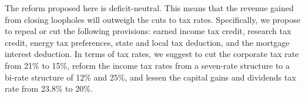 \documentclass{article}
\begin{document}
The reform proposed here is deficit-neutral. This means that the revenue gained
from closing loopholes will outweigh the cuts to tax rates. Specifically, we
propose to repeal or cut the following provisions: earned income tax credit,
research tax credit, energy tax preferences, state and local tax deduction, and
the mortgage interest deduction. In terms of tax rates, we suggest to cut the
corporate tax rate from 21\% to 15\%, reform the income tax rates from a
seven-rate structure to a bi-rate structure of 12\% and 25\%, and lessen the
capital gains and dividends tax rate from 23.8\% to 20\%.
\end{document}
